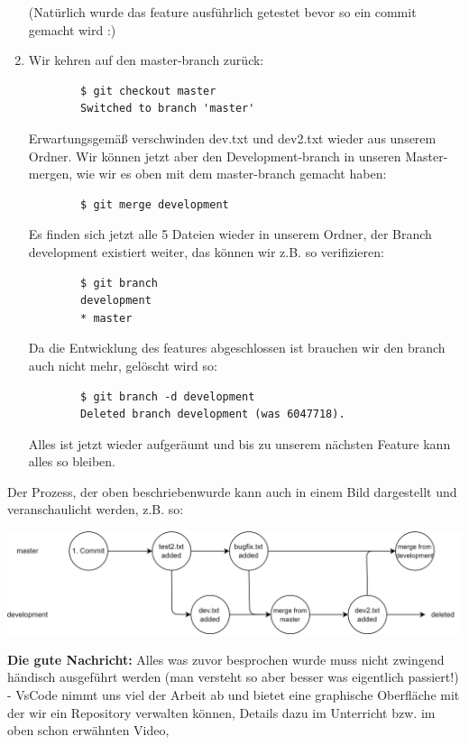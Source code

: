 \documentclass{article}
\begin{document}
\begin{enumerate}
    (Natürlich wurde das feature ausführlich getestet bevor so ein commit gemacht wird :)
    \item Wir kehren auf den master-branch zurück:
    \begin{verbatim}
        $ git checkout master
        Switched to branch 'master'
    \end{verbatim}
    Erwartungsgemäß verschwinden dev.txt und dev2.txt wieder aus unserem Ordner. Wir können jetzt aber den Development-branch in unseren Master-mergen, wie wir es oben mit dem master-branch gemacht haben:
    \begin{verbatim}
        $ git merge development
    \end{verbatim}
    Es finden sich jetzt alle 5 Dateien wieder in unserem Ordner, der Branch development existiert weiter, das können wir z.B. so verifizieren:
    \begin{verbatim}
        $ git branch 
        development 
        * master
    \end{verbatim}
    Da die Entwicklung des features abgeschlossen ist brauchen wir den branch auch nicht mehr, gelöscht wird so:
    \begin{verbatim}
        $ git branch -d development
        Deleted branch development (was 6047718).
    \end{verbatim}
    Alles ist jetzt wieder aufgeräumt und bis zu unserem nächsten Feature kann alles so bleiben.
\end{enumerate}
Der Prozess, der oben beschriebenwurde kann auch in einem Bild dargestellt und veranschaulicht werden, z.B. so: 
\begin{center}
    \includegraphics[scale=0.2]{../media/git_example.png}
\end{center}

\textbf{Die gute Nachricht:} Alles was zuvor besprochen wurde muss nicht zwingend händisch ausgeführt werden (man versteht so aber besser was eigentlich passiert!) - VsCode nimmt uns viel der Arbeit ab und bietet eine graphische Oberfläche mit der wir ein Repository verwalten können, Details dazu im Unterricht bzw. im oben schon erwähnten Video,
\end{document}
